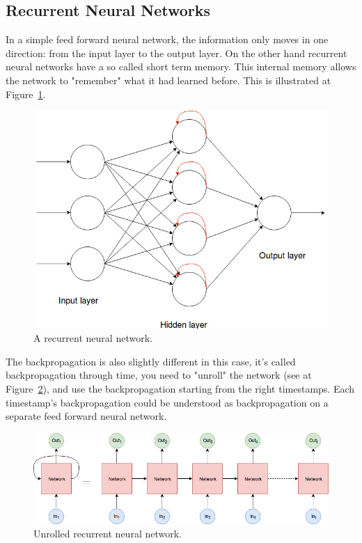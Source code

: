 \subsection{Recurrent Neural Networks}
In a simple feed forward neural network, the information only moves in one direction: from the input layer to the output layer. On the other hand recurrent neural networks have a so called short term memory. This internal memory allows the network to "remember" what it had learned before. This is illustrated at Figure~\ref{fig:recurrent_net}.
\begin{figure}[!htb]
	\centering
	\includegraphics[scale=0.5]{recurrent_neural_network.jpg}
	\caption{A recurrent neural network.}
	\label{fig:recurrent_net}
\end{figure}

The backpropagation is also slightly different in this case, it's called backpropagation through time, you need to "unroll" the network (see at Figure~\ref{fig:unrolled}), and use the backpropagation starting from the right timestamps. Each timestamp's backpropagation could be understood as backpropagation on a separate feed forward neural network. 
\begin{figure}[!htb]
	\centering
	\includegraphics[scale=0.5]{unrolled.jpg}
	\caption{Unrolled recurrent neural network.}
	\label{fig:unrolled}
\end{figure}


